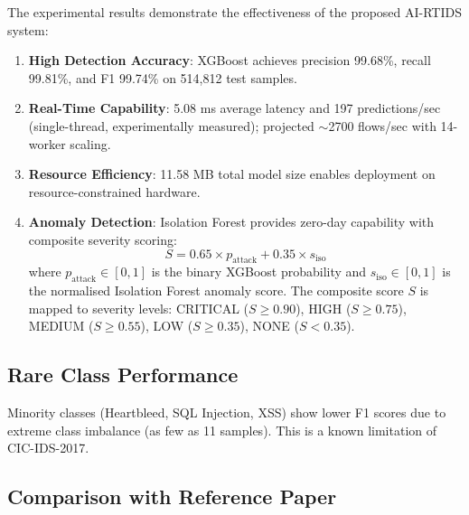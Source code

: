 \documentclass[12pt,a4paper]{article}
\begin{document}
The experimental results demonstrate the effectiveness of the proposed AI-RTIDS system:

\begin{enumerate}
    \item \textbf{High Detection Accuracy}: XGBoost achieves precision 99.68\%, recall 99.81\%, and F1 99.74\% on 514,812 test samples.
    \item \textbf{Real-Time Capability}: 5.08 ms average latency and 197 predictions/sec (single-thread, experimentally measured); projected $\sim$2700 flows/sec with 14-worker scaling.
    \item \textbf{Resource Efficiency}: 11.58 MB total model size enables deployment on resource-constrained hardware.
    \item \textbf{Anomaly Detection}: Isolation Forest provides zero-day capability with composite severity scoring:
    \begin{equation}
        S = 0.65 \times p_{\text{attack}} + 0.35 \times s_{\text{iso}}
        \label{eq:severity}
    \end{equation}
    where $p_{\text{attack}} \in [0,1]$ is the binary XGBoost probability and $s_{\text{iso}} \in [0,1]$ is the normalised Isolation Forest anomaly score. The composite score $S$ is mapped to severity levels: CRITICAL ($S \geq 0.90$), HIGH ($S \geq 0.75$), MEDIUM ($S \geq 0.55$), LOW ($S \geq 0.35$), NONE ($S < 0.35$).
\end{enumerate}

\subsection{Rare Class Performance}

Minority classes (Heartbleed, SQL Injection, XSS) show lower F1 scores due to extreme class imbalance (as few as 11 samples). This is a known limitation of CIC-IDS-2017.

\subsection{Comparison with Reference Paper}
\end{document}
